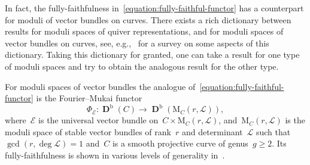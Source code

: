 \documentclass[JEP,XML,SOM,Unicode,NoEqCountersInSection,published]{cedram}
\theoremstyle{plain}
\theoremstyle{definition}
\DeclareMathOperator\derived{\mathbf{D}}
\newcommand\bounded{\ensuremath{\mathrm{b}}}
\begin{document}
In fact, the fully-faithfulness in~\eqref{equation:fully-faithful-functor}
has a counterpart for moduli of vector bundles on curves.
There exists a rich dictionary between
results for moduli spaces of quiver representations,
and for moduli spaces of vector bundles on curves,
see, e.g.,~\cite{MR3882963} for a survey on some aspects of this dictionary.
Taking this dictionary for granted,
one can take a result for one type of moduli spaces
and try to obtain the analogous result for the other type.

For moduli spaces of vector bundles
the analogue of~\eqref{equation:fully-faithful-functor}
is the Fourier--Mukai functor
\begin{equation*}
\Phi_{\mathcal{E}}\colon\derived^\bounded(C)\to\derived^\bounded(\mathrm{M}_C(r,\mathcal{L})),
\end{equation*}
where~$\mathcal{E}$ is the universal vector bundle on~$C\times\mathrm{M}_C(r,\mathcal{L})$,
and~$\mathrm{M}_C(r,\mathcal{L})$ is the moduli space of
stable vector bundles of rank~$r$ and determinant~$\mathcal{L}$
such that~$\gcd(r,\deg\mathcal{L})=1$
and~$C$ is a smooth projective curve of genus~$g\geq 2$.
Its fully-faithfulness is shown in various levels of generality in~\cite{MR3764066,MR3954042,MR3713871,MR4651618}.
\end{document}
